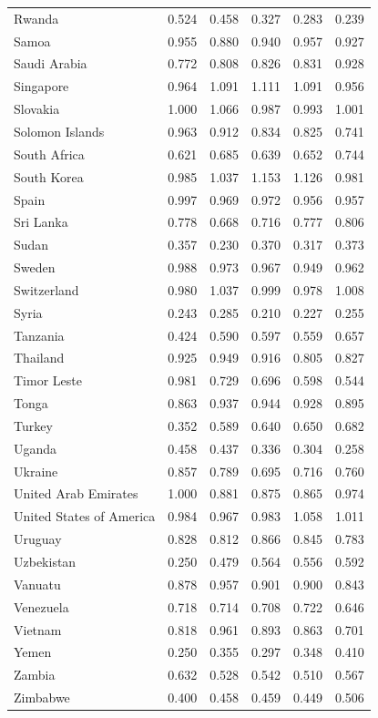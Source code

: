 \documentclass[runningheads]{llncs}
\begin{document}
{\begin{longtable}{p{}rrrrr}
Rwanda & 0.524 & 0.458 & 0.327 & 0.283 & 0.239 \\
Samoa & 0.955 & 0.880 & 0.940 & 0.957 & 0.927 \\
Saudi Arabia & 0.772 & 0.808 & 0.826 & 0.831 & 0.928 \\
Singapore & 0.964 & 1.091 & 1.111 & 1.091 & 0.956 \\
Slovakia & 1.000 & 1.066 & 0.987 & 0.993 & 1.001 \\
Solomon Islands & 0.963 & 0.912 & 0.834 & 0.825 & 0.741 \\
South Africa & 0.621 & 0.685 & 0.639 & 0.652 & 0.744 \\
South Korea & 0.985 & 1.037 & 1.153 & 1.126 & 0.981 \\
Spain & 0.997 & 0.969 & 0.972 & 0.956 & 0.957 \\
Sri Lanka & 0.778 & 0.668 & 0.716 & 0.777 & 0.806 \\
Sudan & 0.357 & 0.230 & 0.370 & 0.317 & 0.373 \\
Sweden & 0.988 & 0.973 & 0.967 & 0.949 & 0.962 \\
Switzerland & 0.980 & 1.037 & 0.999 & 0.978 & 1.008 \\
Syria & 0.243 & 0.285 & 0.210 & 0.227 & 0.255 \\
Tanzania & 0.424 & 0.590 & 0.597 & 0.559 & 0.657 \\
Thailand & 0.925 & 0.949 & 0.916 & 0.805 & 0.827 \\
Timor Leste & 0.981 & 0.729 & 0.696 & 0.598 & 0.544 \\
Tonga & 0.863 & 0.937 & 0.944 & 0.928 & 0.895 \\
Turkey & 0.352 & 0.589 & 0.640 & 0.650 & 0.682 \\
Uganda & 0.458 & 0.437 & 0.336 & 0.304 & 0.258 \\
Ukraine & 0.857 & 0.789 & 0.695 & 0.716 & 0.760 \\
United Arab Emirates & 1.000 & 0.881 & 0.875 & 0.865 & 0.974 \\
United States of America & 0.984 & 0.967 & 0.983 & 1.058 & 1.011 \\
Uruguay & 0.828 & 0.812 & 0.866 & 0.845 & 0.783 \\
Uzbekistan & 0.250 & 0.479 & 0.564 & 0.556 & 0.592 \\
Vanuatu & 0.878 & 0.957 & 0.901 & 0.900 & 0.843 \\
Venezuela & 0.718 & 0.714 & 0.708 & 0.722 & 0.646 \\
Vietnam & 0.818 & 0.961 & 0.893 & 0.863 & 0.701 \\
Yemen & 0.250 & 0.355 & 0.297 & 0.348 & 0.410 \\
Zambia & 0.632 & 0.528 & 0.542 & 0.510 & 0.567 \\
Zimbabwe & 0.400 & 0.458 & 0.459 & 0.449 & 0.506 \\
\hline
\end{longtable}
}



\end{document}

